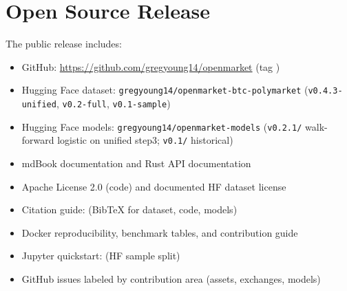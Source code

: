 \section{Open Source Release}
\label{sec:release}

The public release includes:
\begin{itemize}
  \item GitHub: \url{https://github.com/gregyoung14/openmarket} (tag
        \OpenMarketReleaseTag{})
  \item Hugging Face dataset: \texttt{gregyoung14/openmarket-btc-polymarket}
        (\texttt{v0.4.3-unified}, \texttt{v0.2-full}, \texttt{v0.1-sample})
  \item Hugging Face models: \texttt{gregyoung14/openmarket-models}
        (\texttt{v0.2.1/} walk-forward logistic on unified step3;
        \texttt{v0.1/} historical)
  \item mdBook documentation and Rust API documentation
  \item Apache License 2.0 (code) and documented HF dataset license
  \item Citation guide:  (BibTeX for dataset, code, models)
  \item Docker reproducibility, benchmark tables, and contribution guide
  \item Jupyter quickstart:  (HF sample split)
  \item GitHub issues labeled by contribution area (assets, exchanges, models)
\end{itemize}